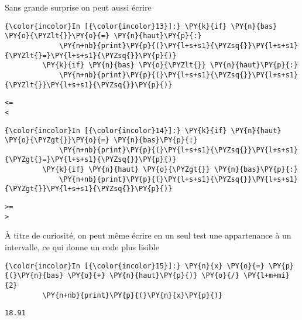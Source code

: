     Sans grande surprise on peut aussi écrire

    \begin{Verbatim}[commandchars=\\\{\}]
{\color{incolor}In [{\color{incolor}13}]:} \PY{k}{if} \PY{n}{bas} \PY{o}{\PYZlt{}}\PY{o}{=} \PY{n}{haut}\PY{p}{:}
             \PY{n+nb}{print}\PY{p}{(}\PY{l+s+s1}{\PYZsq{}}\PY{l+s+s1}{\PYZlt{}=}\PY{l+s+s1}{\PYZsq{}}\PY{p}{)}
         \PY{k}{if} \PY{n}{bas} \PY{o}{\PYZlt{}} \PY{n}{haut}\PY{p}{:}
             \PY{n+nb}{print}\PY{p}{(}\PY{l+s+s1}{\PYZsq{}}\PY{l+s+s1}{\PYZlt{}}\PY{l+s+s1}{\PYZsq{}}\PY{p}{)}
\end{Verbatim}


    \begin{Verbatim}[commandchars=\\\{\}]
<=
<

    \end{Verbatim}

    \begin{Verbatim}[commandchars=\\\{\}]
{\color{incolor}In [{\color{incolor}14}]:} \PY{k}{if} \PY{n}{haut} \PY{o}{\PYZgt{}}\PY{o}{=} \PY{n}{bas}\PY{p}{:}
             \PY{n+nb}{print}\PY{p}{(}\PY{l+s+s1}{\PYZsq{}}\PY{l+s+s1}{\PYZgt{}=}\PY{l+s+s1}{\PYZsq{}}\PY{p}{)}
         \PY{k}{if} \PY{n}{haut} \PY{o}{\PYZgt{}} \PY{n}{bas}\PY{p}{:}
             \PY{n+nb}{print}\PY{p}{(}\PY{l+s+s1}{\PYZsq{}}\PY{l+s+s1}{\PYZgt{}}\PY{l+s+s1}{\PYZsq{}}\PY{p}{)}
\end{Verbatim}


    \begin{Verbatim}[commandchars=\\\{\}]
>=
>

    \end{Verbatim}

    À titre de curiosité, on peut même écrire en un seul test une
appartenance à un intervalle, ce qui donne un code plus lisible

    \begin{Verbatim}[commandchars=\\\{\}]
{\color{incolor}In [{\color{incolor}15}]:} \PY{n}{x} \PY{o}{=} \PY{p}{(}\PY{n}{bas} \PY{o}{+} \PY{n}{haut}\PY{p}{)} \PY{o}{/} \PY{l+m+mi}{2}
         \PY{n+nb}{print}\PY{p}{(}\PY{n}{x}\PY{p}{)}
\end{Verbatim}


    \begin{Verbatim}[commandchars=\\\{\}]
18.91

    \end{Verbatim}

